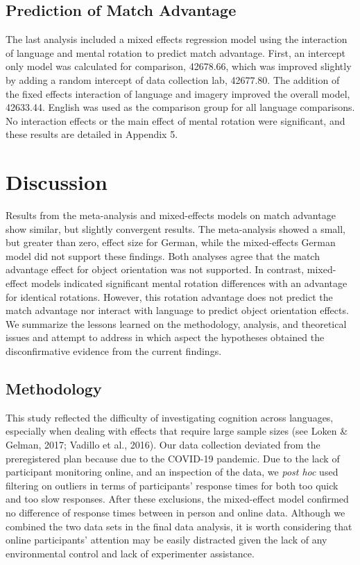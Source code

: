 \documentclass[
  man,floatsintext]{apa7}
\begin{document}
\hypertarget{prediction-of-match-advantage}{%
\subsection{Prediction of Match Advantage}\label{prediction-of-match-advantage}}

The last analysis included a mixed effects regression model using the interaction of language and mental rotation to predict match advantage. First, an intercept only model was calculated for comparison, 42678.66, which was improved slightly by adding a random intercept of data collection lab, 42677.80. The addition of the fixed effects interaction of language and imagery improved the overall model, 42633.44. English was used as the comparison group for all language comparisons. No interaction effects or the main effect of mental rotation were significant, and these results are detailed in Appendix 5.

\hypertarget{discussion}{%
\section{Discussion}\label{discussion}}

Results from the meta-analysis and mixed-effects models on match advantage show similar, but slightly convergent results. The meta-analysis showed a small, but greater than zero, effect size for German, while the mixed-effects German model did not support these findings. Both analyses agree that the match advantage effect for object orientation was not supported. In contrast, mixed-effect models indicated significant mental rotation differences with an advantage for identical rotations. However, this rotation advantage does not predict the match advantage nor interact with language to predict object orientation effects. We summarize the lessons learned on the methodology, analysis, and theoretical issues and attempt to address in which aspect the hypotheses obtained the disconfirmative evidence from the current findings.

\hypertarget{methodology}{%
\subsection{Methodology}\label{methodology}}

This study reflected the difficulty of investigating cognition across languages, especially when dealing with effects that require large sample sizes (see Loken \& Gelman, 2017; Vadillo et al., 2016). Our data collection deviated from the preregistered plan because due to the COVID-19 pandemic. Due to the lack of participant monitoring online, and an inspection of the data, we \emph{post hoc} used filtering on outliers in terms of participants' response times for both too quick and too slow responses. After these exclusions, the mixed-effect model confirmed no difference of response times between in person and online data. Although we combined the two data sets in the final data analysis, it is worth considering that online participants' attention may be easily distracted given the lack of any environmental control and lack of experimenter assistance.
\end{document}

